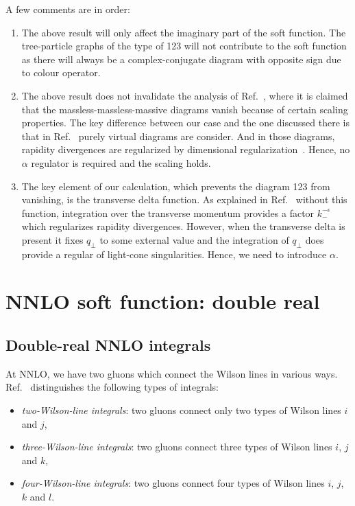\documentclass[a4paper,11pt]{report}
\numberwithin{equation}{section}
\begin{document}
A few comments are in order:
%
\begin{enumerate}
  \item
  The above result will only affect the imaginary part of the soft function. The
  tree-particle graphs of the type of 123 will not contribute to the soft
  function as there will always be a complex-conjugate diagram with opposite
  sign due to colour operator.
  \item
  The above result does not invalidate the analysis of Ref.~\cite{Aybat:2006wq},
  where it is claimed that the massless-massless-massive diagrams vanish because
  of certain scaling properties. The key difference between our case and the one
  discussed there is that in Ref.~\cite{Aybat:2006wq} purely virtual diagrams
  are consider. And in those diagrams, rapidity divergences are regularized by
  dimensional regularization~\cite{Becher:2011dz}.  Hence, no $\alpha$ regulator
  is required and the scaling holds.
  \item
  The key element of our calculation, which prevents the diagram 123 from
  vanishing, is the transverse delta function. As explained in
  Ref.~\cite{Becher:2011dz} without this function, integration over the
  transverse momentum provides a factor $k_-^{-\epsilon}$ which regularizes
  rapidity divergences. However, when the transverse delta is present it fixes
  $q_\perp$ to some external value and the integration of $q_\perp$ does
  provide a regular of light-cone singularities. Hence, we need to introduce
  $\alpha$.
\end{enumerate}

\chapter{NNLO soft function: double real}
\section{Double-real NNLO integrals}

At NNLO, we have two gluons which connect the Wilson lines in various ways.
Ref.~\cite{Ferroglia:2012uy} distinguishes the following types of integrals: 
%
\begin{itemize}
  \item
   \emph{two-Wilson-line integrals}: two gluons connect only two types
   of Wilson lines $i$ and $j$,
  \item
   \emph{three-Wilson-line integrals}: two gluons connect three types
   of Wilson lines $i$, $j$ and $k$,
  \item
   \emph{four-Wilson-line integrals}: two gluons connect four types of
   Wilson lines $i$, $j$, $k$ and $l$.
\end{itemize}
\end{document}
